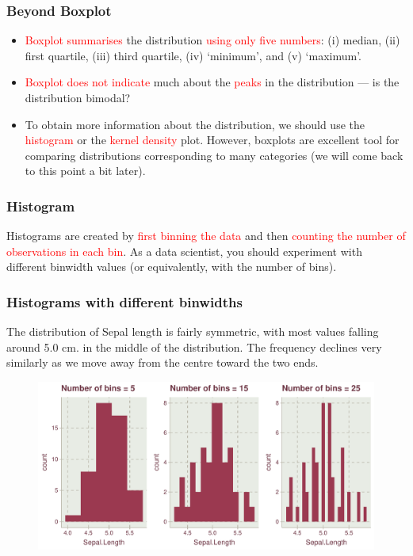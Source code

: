\documentclass{beamer}
\begin{document}
\begin{frame}\frametitle{Beyond Boxplot}
\begin{itemize}
\item \textcolor{red}{Boxplot} \textcolor{red}{summarises} the distribution \textcolor{red}{using only five numbers}: (i) median, (ii) first quartile, (iii) third quartile, (iv) `minimum', and (v) `maximum'. 
\vspace{0.3in}

\item \textcolor{red}{Boxplot does not indicate} much about the \textcolor{red}{peaks} in the distribution --- is the distribution bimodal?

\vspace{0.3in}

\item To obtain more information about the distribution, we should use  the \textcolor{red}{histogram} or the \textcolor{red}{kernel density} plot. However, boxplots are excellent tool for comparing distributions  corresponding to many categories (we will come back to this point a bit later).
\end{itemize}
\end{frame}

\begin{frame}\frametitle{Histogram}
\Large
Histograms are created by \textcolor{red}{first binning the data} and then \textcolor{red}{counting the number of observations in each bin}. As a data scientist, you should experiment with different binwidth values (or equivalently, with the number of bins). 
\end{frame}

\begin{frame}\frametitle{Histograms with different binwidths}
The distribution of Sepal length is fairly symmetric, with most values falling around 5.0 cm. in the middle of the distribution. The frequency declines very similarly as we move away from the centre toward the two ends.
\begin{figure}
\includegraphics[width=0.99\linewidth]{PlotsLec1/SetosaHist}
\end{figure}
\end{frame}
\end{document}
